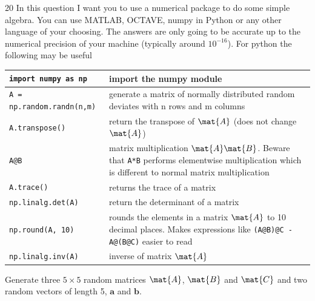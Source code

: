 \documentclass{sotonExamBoxes}    %
\begin{document}
\begin{question}{20}
    In this question I want you to use a numerical package to do some
    simple algebra.  You can use MATLAB, OCTAVE, numpy in Python or
    any other language of your choosing.  The answers are only going
    to be accurate up to the numerical precision of your machine
    (typically around $10^{-16}$).  For python the following may be
    useful
    \begin{tabularx}{\linewidth}{@{}l|X@{}}
      \hline
      \verb+import numpy as np+ & import the numpy module\\ \hline
    \verb+A = np.random.randn(n,m)+ & generate a matrix of
      normally distributed random deviates with n rows and m columns\\ \hline
    \verb+A.transpose()+ & return the transpose of $\mat{A}$
      (does not change $\mat{A}$)\\ \hline
    \verb+A@B+ & matrix multiplication $\mat{A}\mat{B}$.  Beware
      that \verb+A*B+ performs elementwise multiplication which is
      different to normal matrix multiplication\\ \hline
    \verb+A.trace()+ & returns the trace of a matrix\\ \hline
    \verb+np.linalg.det(A)+ & return the determinant of a matrix\\ \hline
    \verb+np.round(A, 10)+ & rounds the elements in a matrix
      $\mat{A}$ to 10 decimal places.  Makes expressions like
      \verb+(A@B)@C - A@(B@C)+ easier to read\\ \hline   
    \verb+np.linalg.inv(A)+ & inverse of matrix $\mat{A}$\\ \hline   
    \end{tabularx}

    Generate three $5\times 5$ random matrices $\mat{A}$, $\mat{B}$ and
    $\mat{C}$ and two random vectors of length 5, $\bm{a}$ and $\bm{b}$.

   \begin{qparts}

    

\end{qparts}
\end{question}
\end{document}
